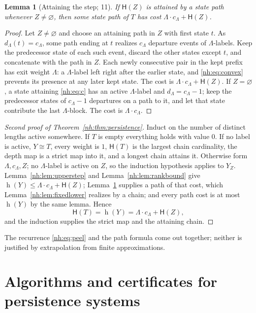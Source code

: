 \documentclass[11pt,a4paper]{article}
\newtheorem{lemma}[theorem]{Lemma}
\theoremstyle{definition}
\theoremstyle{remark}
\newcommand{\hgt}{\operatorname{h}}
\newcommand{\HH}{\mathsf H}
\begin{document}
\begin{lemma}[Attaining the step; 11]\label{nh:lem:lowerstep}
If $\HH(Z)$ is attained by a state path whenever $Z\ne\varnothing$, then some
state path of $T$ has cost $\Lambda\cdot c_\Lambda+\HH(Z)$.
\end{lemma}
\begin{proof}
Let $Z\ne\varnothing$ and choose an attaining path in $Z$ with first state
$t$. As $d_\Lambda(t)=c_\Lambda$, some path ending at $t$ realizes $c_\Lambda$
departure events of $\Lambda$-labels. Keep the predecessor state of each such
event, discard the other states except $t$, and concatenate with the path in
$Z$. Each newly consecutive pair in the kept prefix has exit weight $\Lambda$:
a $\Lambda$-label left right after the earlier state, and
\eqref{nh:eq:convex} prevents its presence at any later kept state. The cost
is $\Lambda\cdot c_\Lambda+\HH(Z)$. If $Z=\varnothing$, a state attaining
\eqref{nh:eq:c} has an active $\Lambda$-label and $d_\Lambda=c_\Lambda-1$;
keep the predecessor states of $c_\Lambda-1$ departures on a path to it, and
let that state contribute the last $\Lambda$-block. The cost is
$\Lambda\cdot c_\Lambda$.
\end{proof}

\begin{proof}[Second proof of Theorem~\ref{nh:thm:persistence}]
Induct on the number of distinct lengths active somewhere. If $T$ is empty
everything holds with value $0$. If no label is active, $Y\cong T$, every
weight is $1$, $\HH(T)$ is the largest chain cardinality, the depth map is a
strict map into it, and a longest chain attains it. Otherwise form
$\Lambda,c_\Lambda,Z$; no $\Lambda$-label is active on $Z$, so the induction
hypothesis applies to $Y_Z$. Lemma~\ref{nh:lem:upperstep} and
Lemma~\ref{nh:lem:rankbound} give $\hgt(Y)\le\Lambda\cdot c_\Lambda+\HH(Z)$;
Lemma~\ref{nh:lem:lowerstep} supplies a path of that cost, which
Lemma~\ref{nh:lem:fixedlower} realizes by a chain; and every path cost is at
most $\hgt(Y)$ by the same lemma. Hence
\begin{equation}\label{nh:eq:peel}
 \boxed{\HH(T)=\hgt(Y)=\Lambda\cdot c_\Lambda+\HH(Z),}
\end{equation}
and the induction supplies the strict map and the attaining chain.
\end{proof}

The recurrence \eqref{nh:eq:peel} and the path formula come out together;
neither is justified by extrapolation from finite approximations.

\section{Algorithms and certificates for persistence systems}
\label{nh:sec:systemalgorithms}
\end{document}

